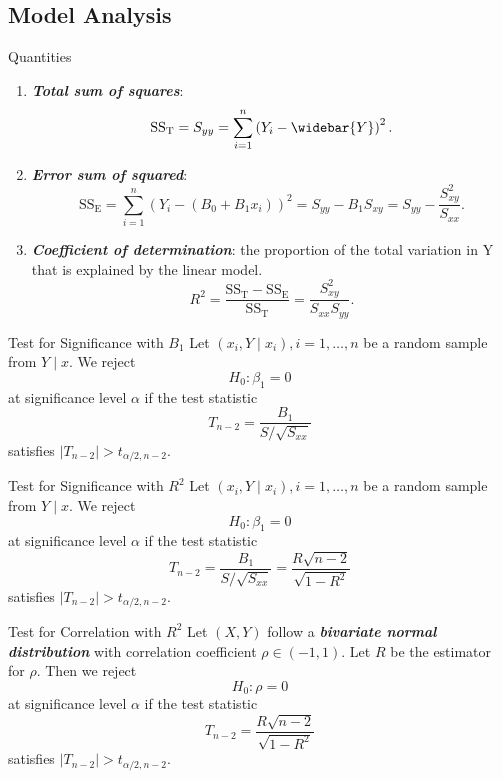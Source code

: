 \documentclass{beamer}
\newcommand{\bb}[1]{\textcolor{antiquefuchsia}{\textbf{\textit{#1}}}}
\begin{document}
\subsection{Model Analysis}
\begin{frame}{Quantities}
\begin{enumerate}
\item \bb{Total sum of squares}:
$$
\mathrm{SS}_{\mathrm{T}}=S_{y y}=\sum_{i=1}^{n}\left(Y_{i}-\widebar{Y}\right)^{2} .
$$
\item \bb{Error sum of squared}:
$$
\mathrm{SS}_{\mathrm{E}}=\sum_{i=1}^{n}\left(Y_{i}-\left(B_{0}+B_{1} x_{i}\right)\right)^{2}=S_{y y}-B_{1} S_{x y}=S_{y y}-\frac{S_{x y}^{2}}{S_{x x}} .
$$
\item \bb{Coefficient of determination}: the proportion of the total variation in
Y that is explained by the linear model.
$$
R^{2}=\frac{\mathrm{SS}_{\mathrm{T}}-\mathrm{SS}_{\mathrm{E}}}{\mathrm{SS}_{\mathrm{T}}}=\frac{S_{x y}^{2}}{S_{x x} S_{y y}} .
$$
\end{enumerate}
\end{frame}

\begin{frame}{Test for Significance with $B_1$}
Let $\left(x_{i}, Y \mid x_{i}\right), i=1, \ldots, n$ be a random sample from $Y \mid x$. We reject
$$
H_{0}: \beta_{1}=0
$$
at significance level $\alpha$ if the test statistic
$$
T_{n-2}=\frac{B_{1}}{S / \sqrt{S_{x x}}}
$$
satisfies $\left|T_{n-2}\right|>t_{\alpha / 2, n-2}$.
\end{frame}

\begin{frame}{Test for Significance with $R^2$}
Let $\left(x_{i}, Y \mid x_{i}\right), i=1, \ldots, n$ be a random sample from $Y \mid x$. We reject
$$
H_{0}: \beta_{1}=0
$$
at significance level $\alpha$ if the test statistic
$$
T_{n-2}=\frac{B_{1}}{S / \sqrt{S_{x x}}}=\frac{R \sqrt{n-2}}{\sqrt{1-R^{2}}}
$$
satisfies $\left|T_{n-2}\right|>t_{\alpha / 2, n-2}$.
\end{frame}

\begin{frame}{Test for Correlation with $R^2$}
Let $(X, Y)$ follow a \bb{bivariate normal distribution} with correlation coefficient $\rho \in(-1,1)$. Let $R$ be the estimator for $\rho$. Then we reject
$$
H_{0}: \rho=0
$$
at significance level $\alpha$ if the test statistic
$$
T_{n-2}=\frac{R \sqrt{n-2}}{\sqrt{1-R^{2}}}
$$
satisfies $\left|T_{n-2}\right|>t_{\alpha / 2, n-2}$.
\end{frame}
\end{document}
